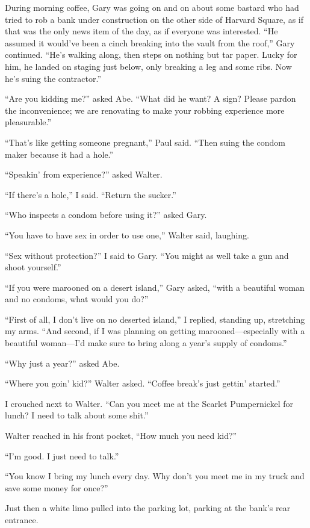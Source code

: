 During morning coffee, Gary was going on and on about some bastard who
had tried to rob a bank under construction on the other side of Harvard
Square, as if that was the only news item of the day, as if everyone was
interested. ``He assumed it would've been a cinch breaking into the
vault from the roof,'' Gary continued. ``He's walking along, then steps
on nothing but tar paper. Lucky for him, he landed on staging just
below, only breaking a leg and some ribs. Now he's suing the
contractor.''

``Are you kidding me?'' asked Abe. ``What did he want? A sign? Please
pardon the inconvenience; we are renovating to make your robbing
experience more pleasurable.''

``That's like getting someone pregnant,'' Paul said. ``Then suing the
condom maker because it had a hole.''

``Speakin' from experience?'' asked Walter.

``If there's a hole,'' I said. ``Return the sucker.''

``Who inspects a condom before using it?'' asked Gary.

``You have to have sex in order to use one,'' Walter said, laughing.

``Sex without protection?'' I said to Gary. ``You might as well take a
gun and shoot yourself.''

``If you were marooned on a desert island,'' Gary asked, ``with a
beautiful woman and no condoms, what would you do?''

``First of all, I don't live on no deserted island,'' I replied,
standing up, stretching my arms. ``And second, if I was planning on
getting marooned---especially with a beautiful woman---I'd make sure to
bring along a year's supply of condoms.''

``Why just a year?'' asked Abe.

``Where you goin' kid?'' Walter asked. ``Coffee break's just gettin'
started.''

I crouched next to Walter. ``Can you meet me at the Scarlet Pumpernickel
for lunch? I need to talk about some shit.''

Walter reached in his front pocket, ``How much you need kid?''

``I'm good. I just need to talk.''

``You know I bring my lunch every day. Why don't you meet me in my truck
and save some money for once?''

Just then a white limo pulled into the parking lot, parking at the
bank's rear entrance.

